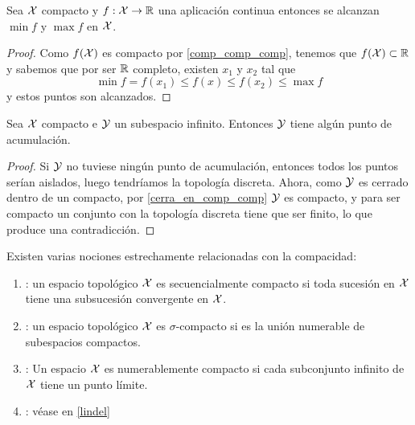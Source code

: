 \begin{prop}
	Sea $\mathcal{X}$ compacto y $f:\mathcal{X} \rightarrow \mathbb{R}$ una aplicación continua entonces se alcanzan $\min f$ y $\max f$ en $\mathcal{X}$.
	\begin{proof}
		Como $f(\mathcal{X})$ es compacto por \ref{comp_comp_comp}, tenemos que $f(\mathcal{X}) \subset \mathbb{R}$ y sabemos que por ser $\mathbb{R}$ completo, existen $x_1$ y $x_2$ tal que
		\begin{equation*}
			\min f = f(x_1) \leq f(x) \leq f(x_2) \leq \max f
		\end{equation*}
		y estos puntos son alcanzados.
	\end{proof}
\end{prop}


\begin{prop}
		Sea $\mathcal{X}$ compacto e $\mathcal{Y}$ un subespacio infinito. Entonces $\mathcal{Y}$ tiene algún punto de acumulación.
	\begin{proof}
		Si $\mathcal{Y}$ no tuviese ningún punto de acumulación, entonces todos los puntos serían aislados, luego tendríamos la topología discreta. Ahora, como $\mathcal{Y}$ es cerrado dentro de un compacto, por \ref{cerra_en_comp_comp} $\mathcal{Y}$ es compacto, y para ser compacto un conjunto con la topología discreta tiene que ser finito, lo que produce una contradicción.
	\end{proof}
\end{prop}

\begin{defi}[Definiciones] Existen varias nociones estrechamente relacionadas con la compacidad:
	\begin{enumerate}
		\item {}: un espacio topológico	$\mathcal{X}$ es secuencialmente compacto si toda sucesión en $\mathcal{X}$ tiene una subsucesión convergente en $\mathcal{X}$.
		\item {}:  un espacio topológico $\mathcal{X}$ es $\sigma$-compacto si es la unión numerable de subespacios compactos.
		\item {}: Un espacio $\mathcal{X}$ es numerablemente compacto si cada subconjunto infinito de $\mathcal{X}$ tiene un punto límite.
		\item {}: véase en \ref{lindel}
	\end{enumerate}
\end{defi}

